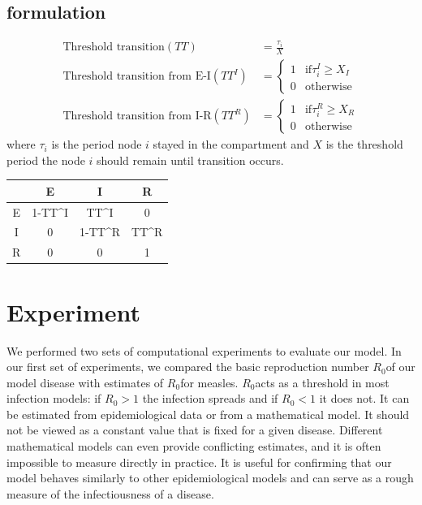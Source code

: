 \documentclass[conference]{IEEEtran}
\newcommand{\ro}{$R_0$}
\begin{document}
\subsection{formulation}
\begin{align*}
    \text{Threshold transition}(TT) &= \frac{\tau_{i}}{X}\\
    \text{Threshold transition from E-I}(TT^{I}) &=%
    \begin{cases}
    1 &\text{if} \tau_{i}^{I} \geq X_{I}\\
    0 &\text{otherwise}
    \end{cases}\\
    \text{Threshold transition from I-R}(TT^{R}) &=%
    \begin{cases}
    1 &\text{if} \tau_{i}^{R} \geq X_{R}\\
    0 &\text{otherwise}
    \end{cases}
\end{align*}
where $\tau_i$ is the period node $i$ stayed in the compartment and $X$ is the threshold period the node $i$ should remain until transition occurs. 
\begin{tabular}{C | C | C | C }
        \hphantom{ } & E & I & R\\
        \hline
        E &  1-TT^{I} & TT^{I} & 0\\
        I &  0 & 1-TT^{R} & TT^{R}\\
        R &  0 & 0 & 1\\
   \end{tabular}

\section{Experiment} %
We performed two sets of computational experiments to evaluate our model. In our first set of experiments, we compared the basic reproduction number \ro of our model disease with estimates of \ro for measles. \ro acts as a threshold in most infection models: if $R_0 > 1$ the infection spreads and if $R_0 < 1$ it does not. It can be estimated from epidemiological data or from a mathematical model. It should not be viewed as a constant value that is fixed for a given disease. Different mathematical models can even provide conflicting estimates, and it is often impossible to measure directly in practice.\cite{Li2011TheFO} It is useful for confirming that our model behaves similarly to other epidemiological models and can serve as a rough measure of the infectiousness of a disease.
\end{document}
